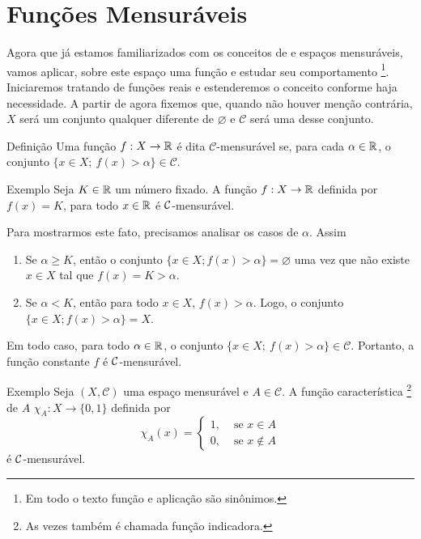 \section{Funções Mensuráveis}


Agora que já estamos familiarizados com os conceitos de \sigal e espaços mensuráveis, vamos aplicar, sobre este espaço uma função e estudar seu comportamento
%
\footnote{Em todo o texto função e aplicação são sinônimos.}.
%
Iniciaremos tratando de funções reais e estenderemos o conceito conforme haja necessidade.
A partir de agora fixemos que, quando não houver menção contrária, $X$ será um conjunto qualquer diferente de $\varnothing$ e $\mathcal{C}$ será uma \sigal desse conjunto. 

\begin{resultado}{Definição}
	\label{def:mensurabilidade-funções-reais}
    Uma função $f: X \to \mathbb{R} $ é dita $\mathcal{C}$-mensurável se, para cada $\alpha \in \mathbb{R}$, o conjunto $\{x \in X;\ f(x) > \alpha\} \in \mathcal{C}$.
\end{resultado}


\begin{resultado}{Exemplo}
\label{ex:funcao-constante}
	Seja $K \in \mathbb{R}$ um número fixado. 
	A função $f: X \to \mathbb{R}$ definida por $f(x) = K$, para todo $x \in \mathbb{R}$  é $\operatorname{\mathcal{C}}$-mensurável.
\end{resultado}
Para mostrarmos este fato, precisamos analisar os casos de $\alpha$.
Assim
	\begin{enumerate}[label*= (\Roman*)]
		\item Se $\alpha \geq K$, então o conjunto $\{x \in X; f(x) > \alpha\} = \varnothing$ uma vez que não existe $x \in X$ tal que $f(x)= K > \alpha$.
		\item Se $\alpha < K$, então para todo $x \in X$, $f(x) > \alpha$.
		Logo, o conjunto $\{x \in X; f(x) > \alpha\} = X$.
	\end{enumerate}
Em todo caso, para todo $\alpha \in \mathbb{R}$, o conjunto  $\{x \in X;\ f(x) > \alpha\} \in \mathcal{C}$.
Portanto, a função constante $f$ é $\operatorname{\mathcal{C}}$-mensurável.

\begin{resultado}{Exemplo}
    Seja $(X, \mathcal{C})$ uma espaço mensurável e $A \in \mathcal{C}$.
    A função característica \footnote{As vezes também é chamada  função indicadora.} de $A$ 
    $\chi_A: X \to \{0,1\}$ definida por 
    $$\chi_A(x) =\left\{\begin{array}{cc}
         1, & \textrm{\ se \ } x \in A \\
         0, & \textrm{\ se \ } x \notin A
    \end{array}\right.
    $$
    é $\operatorname{\mathcal{C}}$-mensurável.
\end{resultado}

